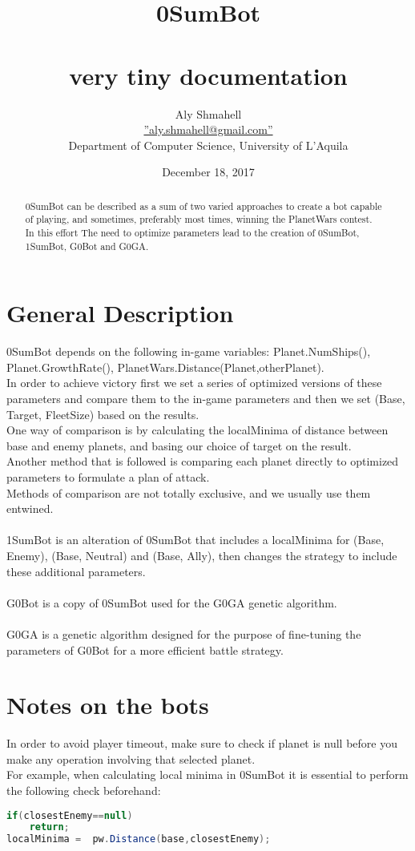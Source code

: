 \documentclass[12pt]{report}
\title{%
	0SumBot\\\\
	\tiny{very tiny documentation}}
\date{December 18, 2017}
\author{Aly Shmahell\\\hyperref[aly.shmahell@gmail.com]{''aly.shmahell@gmail.com''}\\ Department of Computer Science, University of L'Aquila}
\begin{document}
	\begin{abstract}
		0SumBot can be described as a sum of two varied approaches to create a bot capable of playing, and sometimes, preferably most times, winning the PlanetWars contest.\\
		In this effort The need to optimize parameters lead to the creation of 0SumBot, 1SumBot, G0Bot and G0GA.
	\end{abstract}
	\section{\textbf{General Description}}
		0SumBot depends on the following in-game variables: Planet.NumShips(), Planet.GrowthRate(), PlanetWars.Distance(Planet,otherPlanet).\\
		In order to achieve victory first we set a series of optimized versions of these parameters and compare them to the in-game parameters and then we set (Base, Target, FleetSize) based on the results.\\
		One way of comparison is by calculating the localMinima of distance between base and enemy planets, and basing our choice of target on the result.\\
		Another method that is followed is comparing each planet directly to optimized parameters to formulate a plan of attack.\\
		Methods of comparison are not totally exclusive, and we usually use them entwined.\\\\
		1SumBot is an alteration of 0SumBot that includes a localMinima for (Base, Enemy), (Base, Neutral) and (Base, Ally), then changes the strategy to include these additional parameters.\\\\
		G0Bot is a copy of 0SumBot used for the G0GA genetic algorithm.\\\\
		G0GA is a genetic algorithm designed for the purpose of fine-tuning the parameters of G0Bot for a more efficient battle strategy.
\section{Notes on the bots}
In order to avoid player timeout, make sure to check if planet is null before you make any operation involving that selected planet.\\
For example, when calculating local minima in 0SumBot it is essential to perform the following check beforehand:
\begin{lstlisting}[language=Java]
if(closestEnemy==null)
	return;
localMinima =  pw.Distance(base,closestEnemy);
\end{lstlisting}
		\newpage
\end{document}
